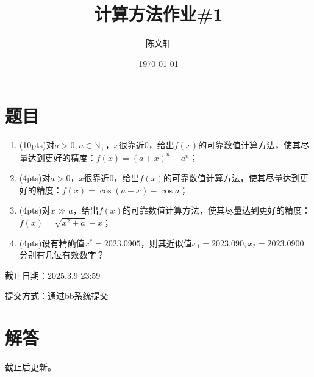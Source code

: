 \documentclass[cn,hazy,green,11pt,normal]{elegantnote}
\title{计算方法作业\#1}
\author{陈文轩}
\institute{KFRC}
\date{\today}
\begin{document}
\maketitle


\section{题目}

    \begin{enumerate}
        \item (10pts)对$a>0,n\in\mathbb{N_+}$，$x$很靠近$0$，给出$f(x)$的可靠数值计算方法，使其尽量达到更好的精度：$f(x)=(a+x)^n-a^n$；
        \item (4pts)对$a>0$，$x$很靠近$0$，给出$f(x)$的可靠数值计算方法，使其尽量达到更好的精度：$f(x)=\cos(a-x)-\cos a$；
        \item (4pts)对$x\gg a$，给出$f(x)$的可靠数值计算方法，使其尽量达到更好的精度：$f(x)=\sqrt{x^2+a}-x$；
        \item (4pts)设有精确值$x^{*}=2023.0905$，则其近似值$x_1=2023.090,x_2=2023.0900$分别有几位有效数字？
    \end{enumerate}

    截止日期：2025.3.9 23:59

    提交方式：通过bb系统提交

\section{解答}
    截止后更新。
\end{document}
